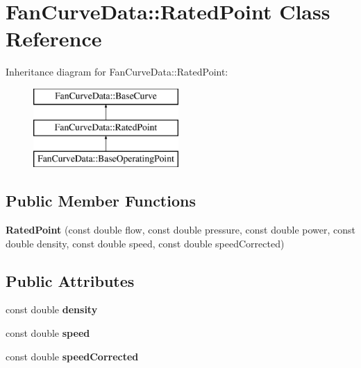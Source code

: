\hypertarget{class_fan_curve_data_1_1_rated_point}{}\section{Fan\+Curve\+Data\+:\+:Rated\+Point Class Reference}
\label{class_fan_curve_data_1_1_rated_point}
Inheritance diagram for Fan\+Curve\+Data\+:\+:Rated\+Point\+:\begin{figure}[H]
\begin{center}
\leavevmode
\includegraphics[height=3.000000cm]{d4/de6/class_fan_curve_data_1_1_rated_point}
\end{center}
\end{figure}
\subsection*{Public Member Functions}
\begin{DoxyCompactItemize}
\item 
\mbox{\label{class_fan_curve_data_1_1_rated_point_a023280b292b8e407d81c433848189f05}} 
{\bfseries Rated\+Point} (const double flow, const double pressure, const double power, const double density, const double speed, const double speed\+Corrected)
\end{DoxyCompactItemize}
\subsection*{Public Attributes}
\begin{DoxyCompactItemize}
\item 
\mbox{\label{class_fan_curve_data_1_1_rated_point_ae85a258074490d9691d6ebac53c38b81}} 
const double {\bfseries density}
\item 
\mbox{\label{class_fan_curve_data_1_1_rated_point_a48f6364f9e14b8a204fef020f967254e}} 
const double {\bfseries speed}
\item 
\mbox{\label{class_fan_curve_data_1_1_rated_point_a845b68ddecfbdbf42c9ea6f0df607a03}} 
const double {\bfseries speed\+Corrected}
\end{DoxyCompactItemize}
